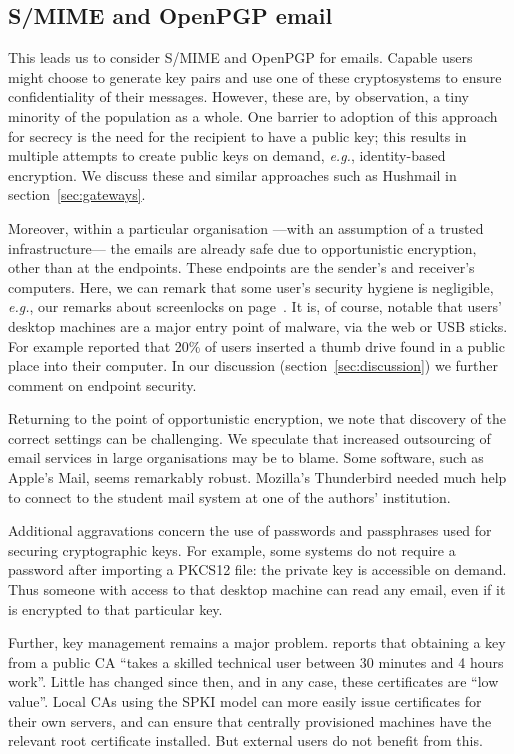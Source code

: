 \documentclass{article}
\def\citeN{\citet}
\newcommand{\eg}{\textit{e.g.}}
\begin{document}
\subsection{S/MIME and OpenPGP email}

This leads us to consider S/MIME and OpenPGP for emails.
Capable users might choose to generate key pairs and use one of these
cryptosystems to ensure confidentiality of their messages.  However,
these are, by observation, a tiny minority of the population as a
whole.  One barrier to adoption of this approach for secrecy is the
need for the recipient to have a public key; this results in multiple
attempts to create public keys on demand, \eg, identity-based
encryption.  We discuss these and similar 
approaches such as Hushmail in section~\ref{sec:gateways}.

Moreover, within a particular organisation ---with an assumption of a
trusted infrastructure--- the emails are already safe due to
opportunistic encryption, other than at the endpoints.  These
endpoints are the sender's and receiver's computers.  Here, we can
remark that some user's security hygiene is negligible, \eg,
our remarks about screenlocks on page~\pageref{pg:screenlocks}.  It
is, of course, notable that users' desktop machines are a major entry
point of malware, via the web or USB sticks.  For example
\citeN[slides 108--109]{McQueen10} reported that 20\% of users inserted a
thumb drive found in a public place into their computer.  In our discussion
(section~\ref{sec:discussion}) we further comment on endpoint security.

Returning to the point of opportunistic encryption, we note that
discovery of the correct settings can be challenging.  We speculate
that increased outsourcing of email services in large organisations
may be to blame.  Some software, such as Apple's Mail, seems
remarkably robust.  Mozilla's Thunderbird needed much help to connect
to the student mail system at one of the authors' institution.

Additional aggravations concern the use of passwords and passphrases
used for securing cryptographic keys.  For example, some systems do
not require a password after importing a PKCS12 file: the private key is
accessible on demand.  Thus someone with access to that desktop
machine can read any email, even if it is encrypted to that particular
key.

Further, key management remains a major problem.  \citeN{Gutmann03}
reports that obtaining a key from a public CA ``takes a skilled
technical user between 30 minutes and 4 hours work''.  Little has
changed since then, and in any case, these certificates are ``low
value''.  Local CAs using the SPKI model can more easily issue
certificates for their own servers, and can ensure that centrally
provisioned machines have the relevant root certificate installed.
But external users do not benefit from this.
\end{document}
